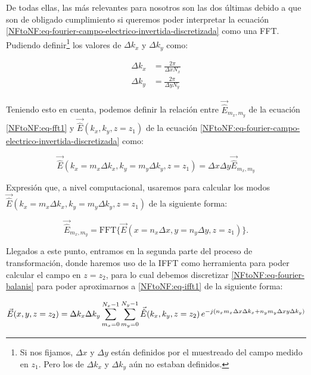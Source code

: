 \newpage

De todas ellas, las más relevantes para nosotros son las dos últimas debido a que son de obligado cumplimiento si queremos poder interpretar la ecuación \eqref{NFtoNF:eq-fourier-campo-electrico-invertida-discretizada} como
una FFT. Pudiendo definir\footnote{Si nos fijamos, $\Delta x$ y $\Delta y$ están
definidos por el muestreado del campo medido en $z_1$. Pero los de $\Delta k_{x}$ y $\Delta k_{y}$ aún no estaban definidos.} los valores de $\Delta k_{x}$ y
$\Delta k_{y}$ como:

\begin{align}
\Delta k_{x}&=\frac{2\pi}{\Delta x N_{x}}
\\
\Delta k_{y}&=\frac{2\pi}{\Delta y N_{y}}
\end{align}

Teniendo esto en cuenta, podemos definir la relación entre 
$\vec{\hat{E}}_{m_{x},m_{y}}$ de la ecuación \eqref{NFtoNF:eq-fft1} y 
$\vec{\hat{E}}(k_{x},k_{y},z=z_{1})$ de la ecuación \eqref{NFtoNF:eq-fourier-campo-electrico-invertida-discretizada} como:

\begin{equation}
\vec{\hat{E}}(k_{x}=m_{x} \Delta k_{x},k_{y}=m_{y} \Delta
k_{y},z=z_{1})= \Delta x \Delta y\vec{\hat{E}}_{m_{x},m_{y}}
\end{equation}

Expresión que, a nivel computacional, usaremos para calcular los modos $\vec{\hat{E}}(k_{x}=m_{x} \Delta k_{x},k_{y}=m_{y} \Delta
k_{y},z=z_{1})$ de la siguiente forma:

\begin{equation}
\vec{\hat{E}}_{m_{x},m_{y}}=\mbox{FFT}\{\vec{E}(x=n_{x}\Delta
x,y=n_{y} \Delta y,z=z_{1})\}.
\label{NFtoNF:eq-FFT-del-campo}
\end{equation}

Llegados a este punto, entramos en la segunda parte del proceso de transformación, donde haremos uso de la IFFT como herramienta para poder calcular el campo en $z=z_2$, para lo cual debemos discretizar \eqref{NFtoNF:eq-fourier-balanis} para poder aproximarnos a \eqref{NFtoNF:eq-ifft1} de la siguiente forma:

\begin{equation}
\vec{E}(x,y,z=z_{2}) =
\\
\Delta k_{x} \Delta k_{y}
\sum_{m_{x}=0}^{N_{x}-1}\sum_{m_{y}=0}^{N_{y}-1} 
\vec{\hat{E}}(k_{x},k_{y},z=z_{2})
\,e^{-j(n_{x}m_{x}\Delta x  \Delta k_{x} + n_{y}m_{y}\Delta xy  \Delta k_{y})}
\end{equation}


